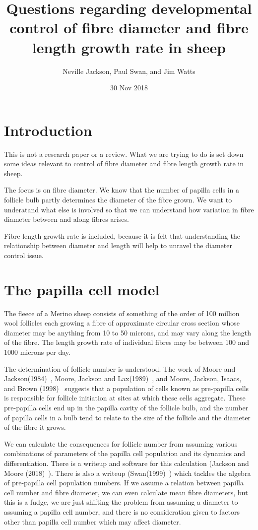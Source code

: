 \documentclass[titlepage]{article}  %
\title{Questions regarding developmental control of fibre diameter and fibre length growth rate in sheep}
\author{Neville Jackson,  Paul Swan, and Jim Watts}
\date{30 Nov 2018}
\begin{document}
 
 
\maketitle      
\tableofcontents

\clearpage
\section{Introduction} 
This is not a research paper or a review. What we are trying to do is set down some ideas relevant to control of fibre diameter and fibre length growth rate in sheep. 

The focus is on fibre diameter. We know that the number of papilla cells in a follicle bulb partly determines the diameter of the fibre grown. We want to  underatand what else is involved so that we can understand how variation in fibre diameter between and along fibres arises. 

Fibre length growth rate is included, because it is felt that understanding the relationship between diameter and length will help to unravel the diameter control issue. 

\section{The papilla cell model}
The fleece of a Merino sheep consists of something of the order of 100 million wool follicles each growing a fibre of approximate circular cross section whose diameter may be anything from 10 to 50 microns, and may vary along the  length of the fibre. The length growth rate of individual fibres may be between 100 and 1000 microns per day. 

The determination of follicle number is understood. The work of Moore and Jackson(1984)~\cite{moor:84}, Moore, Jackson and Lax(1989)~\cite{moor:89}, and Moore, Jackson, Isaacs, and Brown (1998)~\cite{moor:98} suggests that a population of cells known as pre-papilla cells is responsible for follicle initiation at sites at which these cells aggregate. These pre-papilla cells end up in the papilla cavity of the follicle bulb, and the number of papilla cells in a bulb tend to relate to the size of the follicle and the diameter of the fibre it grows.

We can calculate the consequences for follicle number from assuming various combinations of parameters of the papilla cell population and its dynamics and differentiation. There is a writeup and software for this calculation (Jackson and Moore (2018)~\cite{jack:18}). There is also a writeup (Swan(1999)~\cite{swan:99}) which tackles the algebra of pre-papilla cell population numbers. If we assume a relation between papilla cell number and fibre diameter, we can even calculate mean fibre diameters, but this is a fudge, we are just shifting the problem from assuming a diameter to assuming a papilla cell number, and there is no consideration given to factors other than papilla cell number which may affect diameter.
\end{document}
